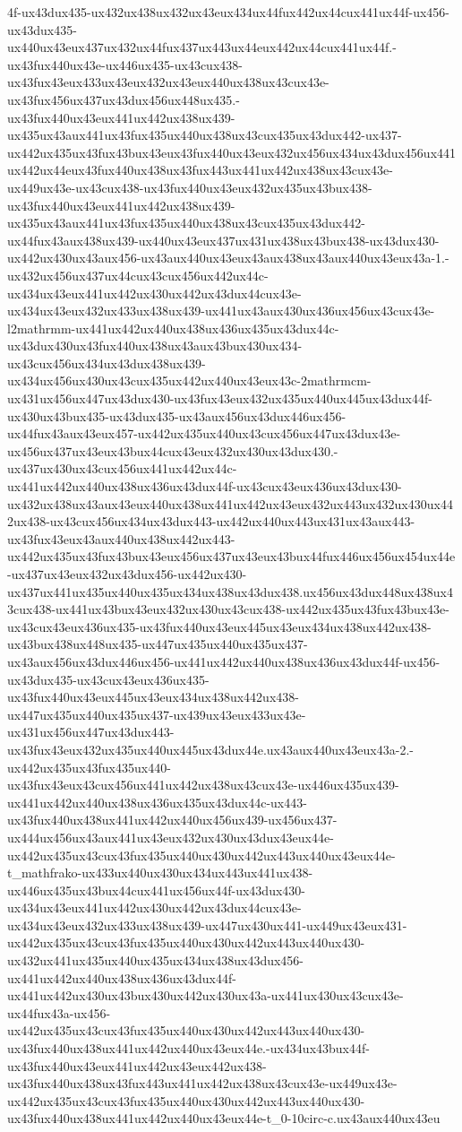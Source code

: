 \documentclass[
  ukrainian,
]{article}
\begin{document}
{{4f-ux43dux435-ux432ux438ux432ux43eux434ux44fux442ux44cux441ux44f-ux456-ux43dux435-ux440ux43eux437ux432ux44fux437ux443ux44eux442ux44cux441ux44f.-ux43fux440ux43e-ux446ux435-ux43cux438-ux43fux43eux433ux43eux432ux43eux440ux438ux43cux43e-ux43fux456ux437ux43dux456ux448ux435.-ux43fux440ux43eux441ux442ux438ux439-ux435ux43aux441ux43fux435ux440ux438ux43cux435ux43dux442-ux437-ux442ux435ux43fux43bux43eux43fux440ux43eux432ux456ux434ux43dux456ux441ux442ux44eux43fux440ux438ux43fux443ux441ux442ux438ux43cux43e-ux449ux43e-ux43cux438-ux43fux440ux43eux432ux435ux43bux438-ux43fux440ux43eux441ux442ux438ux439-ux435ux43aux441ux43fux435ux440ux438ux43cux435ux43dux442-ux44fux43aux438ux439-ux440ux43eux437ux431ux438ux43bux438-ux43dux430-ux442ux430ux43aux456-ux43aux440ux43eux43aux438ux43aux440ux43eux43a-1.-ux432ux456ux437ux44cux43cux456ux442ux44c-ux434ux43eux441ux442ux430ux442ux43dux44cux43e-ux434ux43eux432ux433ux438ux439-ux441ux43aux430ux436ux456ux43cux43e-l2mathrmm-ux441ux442ux440ux438ux436ux435ux43dux44c-ux43dux430ux43fux440ux438ux43aux43bux430ux434-ux43cux456ux434ux43dux438ux439-ux434ux456ux430ux43cux435ux442ux440ux43eux43c-2mathrmcm-ux431ux456ux447ux43dux430-ux43fux43eux432ux435ux440ux445ux43dux44f-ux430ux43bux435-ux43dux435-ux43aux456ux43dux446ux456-ux44fux43aux43eux457-ux442ux435ux440ux43cux456ux447ux43dux43e-ux456ux437ux43eux43bux44cux43eux432ux430ux43dux430.-ux437ux430ux43cux456ux441ux442ux44c-ux441ux442ux440ux438ux436ux43dux44f-ux43cux43eux436ux43dux430-ux432ux438ux43aux43eux440ux438ux441ux442ux43eux432ux443ux432ux430ux442ux438-ux43cux456ux434ux43dux443-ux442ux440ux443ux431ux43aux443-ux43fux43eux43aux440ux438ux442ux443-ux442ux435ux43fux43bux43eux456ux437ux43eux43bux44fux446ux456ux454ux44e-ux437ux43eux432ux43dux456-ux442ux430-ux437ux441ux435ux440ux435ux434ux438ux43dux438.ux456ux43dux448ux438ux43cux438-ux441ux43bux43eux432ux430ux43cux438-ux442ux435ux43fux43bux43e-ux43cux43eux436ux435-ux43fux440ux43eux445ux43eux434ux438ux442ux438-ux43bux438ux448ux435-ux447ux435ux440ux435ux437-ux43aux456ux43dux446ux456-ux441ux442ux440ux438ux436ux43dux44f-ux456-ux43dux435-ux43cux43eux436ux435-ux43fux440ux43eux445ux43eux434ux438ux442ux438-ux447ux435ux440ux435ux437-ux439ux43eux433ux43e-ux431ux456ux447ux43dux443-ux43fux43eux432ux435ux440ux445ux43dux44e.ux43aux440ux43eux43a-2.-ux442ux435ux43fux435ux440-ux43fux43eux43cux456ux441ux442ux438ux43cux43e-ux446ux435ux439-ux441ux442ux440ux438ux436ux435ux43dux44c-ux443-ux43fux440ux438ux441ux442ux440ux456ux439-ux456ux437-ux444ux456ux43aux441ux43eux432ux430ux43dux43eux44e-ux442ux435ux43cux43fux435ux440ux430ux442ux443ux440ux43eux44e-t_mathfrako-ux433ux440ux430ux434ux443ux441ux438-ux446ux435ux43bux44cux441ux456ux44f-ux43dux430-ux434ux43eux441ux442ux430ux442ux43dux44cux43e-ux434ux43eux432ux433ux438ux439-ux447ux430ux441-ux449ux43eux431-ux442ux435ux43cux43fux435ux440ux430ux442ux443ux440ux430-ux432ux441ux435ux440ux435ux434ux438ux43dux456-ux441ux442ux440ux438ux436ux43dux44f-ux441ux442ux430ux43bux430ux442ux430ux43a-ux441ux430ux43cux43e-ux44fux43a-ux456-ux442ux435ux43cux43fux435ux440ux430ux442ux443ux440ux430-ux43fux440ux438ux441ux442ux440ux43eux44e.-ux434ux43bux44f-ux43fux440ux43eux441ux442ux43eux442ux438-ux43fux440ux438ux43fux443ux441ux442ux438ux43cux43e-ux449ux43e-ux442ux435ux43cux43fux435ux440ux430ux442ux443ux440ux430-ux43fux440ux438ux441ux442ux440ux43eux44e-t_0-10circ-c.ux43aux440ux43eu}}
\end{document}

